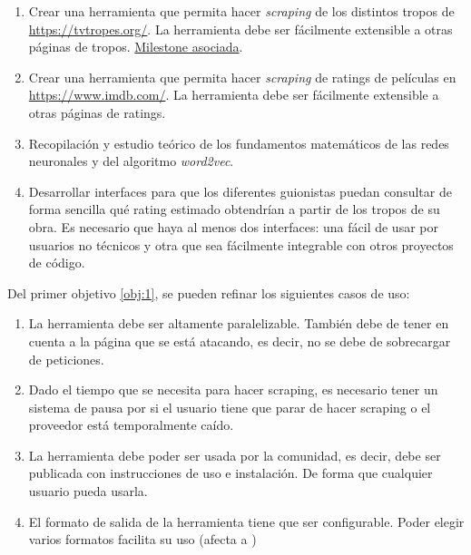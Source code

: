 \begin{enumerate}
      \item \label{obj:1} Crear una herramienta que permita hacer \textit{scraping} de los distintos
            tropos de \url{https://tvtropes.org/}. La herramienta debe ser fácilmente extensible a
            otras páginas de tropos. \href{https://github.com/antoniogamiz/tfg/milestone/3}{Milestone asociada}.
      \item \label{obj:2} Crear una herramienta que permita hacer \textit{scraping} de ratings de
            películas en \url{https://www.imdb.com/}. La herramienta debe ser fácilmente extensible a
            otras páginas de ratings.
      \item \label{obj:3} Recopilación y estudio teórico de los fundamentos matemáticos de las redes
            neuronales y del algoritmo \textit{word2vec}.
      \item \label{obj:4} Desarrollar interfaces para que los diferentes guionistas puedan consultar
            de forma sencilla qué rating estimado obtendrían a partir de los tropos de su obra. Es necesario
            que haya al menos dos interfaces: una fácil de usar por usuarios no técnicos y otra que sea
            fácilmente integrable con otros proyectos de código.
\end{enumerate}

Del primer objetivo \ref{obj:1}, se pueden refinar los siguientes casos de uso:

\begin{enumerate}
      \item \label{us:1} La herramienta debe ser altamente paralelizable. También debe de tener en
            cuenta a la página que se está atacando, es decir, no se debe de sobrecargar de peticiones.
      \item \label{us:2} Dado el tiempo que se necesita para hacer scraping, es necesario tener un
            sistema de pausa por si el usuario tiene que parar de hacer scraping o el proveedor está
            temporalmente caído.
      \item \label{us:3} La herramienta debe poder ser usada por la comunidad, es decir, debe ser
            publicada con instrucciones de uso e instalación. De forma que cualquier usuario pueda usarla.
      \item \label{us:4} El formato de salida de la herramienta tiene que ser configurable. Poder elegir
            varios formatos facilita su uso (afecta a \label{us:3})
\end{enumerate}